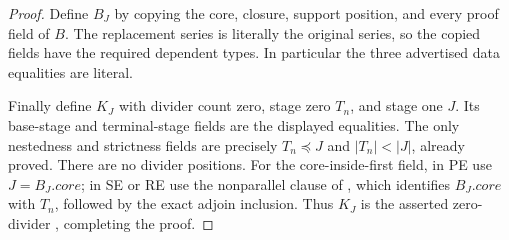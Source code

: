 \begin{proof}
Define $B_J$ by copying the core, closure, support position, and every
proof field of $B$.  The replacement series is literally the original
series, so the copied fields have the required dependent types.  In
particular the three advertised data equalities are literal.

Finally define $K_J$ with divider count zero, stage zero $T_n$, and stage
one $J$.  Its base-stage and terminal-stage fields are the displayed
equalities.  The only nestedness and strictness fields are precisely
$T_n\preccurlyeq J$ and $|T_n|<|J|$, already proved.  There are no divider
positions.  For the core-inside-first field, in PE use $J=B_J.\mathit{core}$;
in SE or RE use the nonparallel clause of , which
identifies $B_J.\mathit{core}$ with $T_n$, followed by the exact adjoin
inclusion.  Thus $K_J$ is the asserted zero-divider
, completing the proof.
\end{proof}
